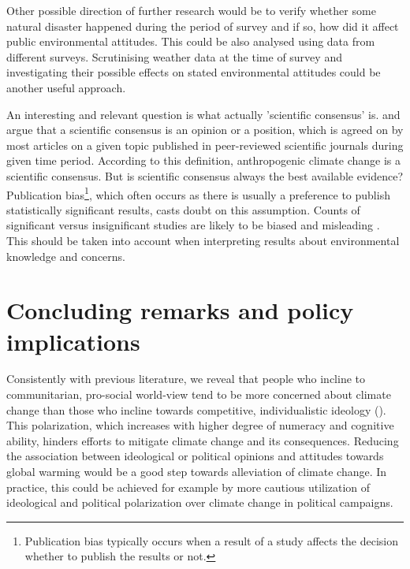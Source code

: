 \documentclass[a4paper,12pt]{article}
\begin{document}
Other possible direction of further research would be to verify whether some natural disaster happened during the period of survey and if so, how did it affect public environmental attitudes. This could be also analysed using data from different surveys. Scrutinising weather data at the time of survey and investigating their possible effects on stated environmental attitudes could be another useful approach.


An interesting and relevant question is what actually 'scientific consensus' is. \citet{Kahan2015} and \citet{Cook2013COnsensus} argue that a scientific consensus is an opinion or a position, which is agreed on by most articles on a given topic published in peer-reviewed scientific journals during given time period. According to this definition, anthropogenic climate change is a scientific consensus. But is scientific consensus always the best available evidence? Publication bias\footnote{Publication bias typically occurs when a result of a study affects the decision whether to publish the results or not.}, which often occurs as there is usually a preference to publish statistically significant results, casts doubt on this assumption. Counts of significant versus insignificant studies are likely to be biased and misleading \citep{PubBias}. This should be taken into account when interpreting results about environmental knowledge and concerns.



\section{Concluding remarks and policy implications}\label{Implications}

Consistently with previous literature, we reveal that people who incline to communitarian, pro-social world-view tend to be more concerned about climate change than those who incline towards competitive, individualistic ideology (\citealp{Leiserowitz2013, Kahan2012, WHITMARSH2011}). This polarization, which increases with higher degree of numeracy and cognitive ability, hinders efforts to mitigate climate change and its consequences. Reducing the association between ideological or political opinions and attitudes towards global warming would be a good step towards alleviation of climate change. In practice, this could be achieved for example by more cautious utilization of ideological and political polarization over climate change in political campaigns. 
\end{document}
